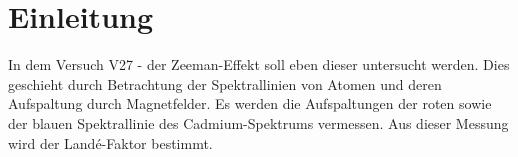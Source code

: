 \section{Einleitung}
\label{sec:einleitung}
In dem Versuch V27 - der Zeeman-Effekt soll eben dieser untersucht werden. Dies
geschieht durch Betrachtung der Spektrallinien von Atomen und deren Aufspaltung
durch Magnetfelder. Es werden die Aufspaltungen der roten sowie der blauen
Spektrallinie des Cadmium-Spektrums vermessen. Aus dieser Messung wird der
Land\'e-Faktor bestimmt.
